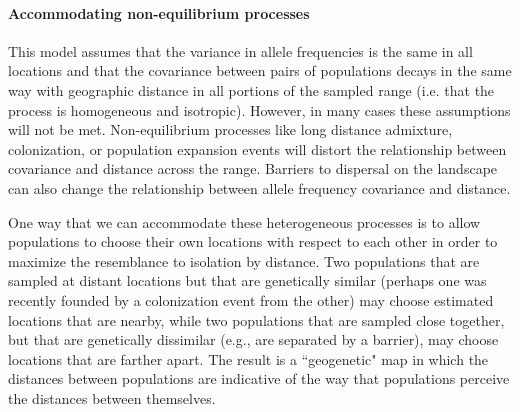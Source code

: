 \documentclass[12pt]{article}
\begin{document}
\paragraph{Accommodating non-equilibrium processes} 

This model assumes that the variance in allele frequencies is the same in all locations and that the covariance between pairs of populations decays in the same way with geographic distance in all portions of the sampled range (i.e. that the process is homogeneous and isotropic). However, in many cases these assumptions will not be met. Non-equilibrium processes like long distance admixture, colonization, or population expansion events will  distort the relationship between covariance and distance across the range.  Barriers to dispersal on the landscape can also change the relationship between allele frequency covariance and distance.

One way that we can accommodate these heterogeneous processes is to allow populations to choose their own locations with respect to each other in order to maximize the resemblance to isolation by distance. Two populations that are sampled at distant locations but that are genetically similar (perhaps one was recently founded by a colonization event from the other) may choose estimated locations that are nearby, while two populations that are sampled close together, but that are genetically dissimilar (e.g., are separated by a barrier), may choose locations that are farther apart. The result is a ``geogenetic" map in which the distances between populations are indicative of the way that populations perceive the distances between themselves.
\end{document}
